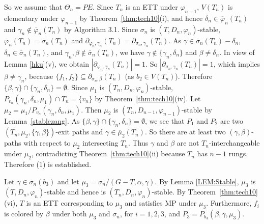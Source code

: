 \documentclass[11pt]{article}
\newcommand{\phibar}{\overline{\varphi}}
\newcommand{\phiv}{\varphi}
\begin{document}
So we assume that $\Theta_n=PE$. Since $T_n$ is an ETT under $\varphi_{n-1}$, $V(T_n)$ is elementary under $\varphi_{n-1}$ by 
Theorem~\ref{thm:tech10}(i), and hence $\delta_n\in\phibar_n(T_n)$ and $\gamma_n\notin\phibar_n(T_n)$ by Algorithm 3.1. Since 
$\sigma_n$ is $(T, D_n, \phiv_{n})$-stable, $\phibar_n(T_n)=\overline{\sigma}_n(T_n)$ and  $\partial_{\varphi_n, \gamma_n}(T_n)=
\partial_{\sigma_n, \gamma_n}(T_n)$. As $\gamma\in\overline{\sigma}_n(T_n)-\delta_n$, $\delta_n\in\overline{\sigma}_n(T_n)$, 
and $\gamma_n, \beta \notin \overline{\sigma}_n(T_n)$,  we have $\gamma\notin \{\gamma_n,\delta_n\}$ and $\beta\neq\delta_n$. 
In view of Lemma \ref{hku}(v), we obtain $|\partial_{\varphi_n, \gamma_n}(T_n)|=1$. So $|\partial_{\sigma_n, \gamma_n}(T_n)|=1$, 
which implies $\beta\neq\gamma_n$, because $\{f_1,f_2\} \subseteq  \partial_{\sigma_n, \beta}(T_n)$ (as $b_2\in V(T_n)$). Therefore 
$\{\beta, \gamma\}\cap \{\gamma_n,\delta_n\}=\emptyset$. 
Since $\mu_1$ is $(T_n,D_n,\varphi_n)$-stable, $P_{v_n}(\gamma_n,\delta_n,\mu_1) \cap T_n=\{v_n\}$ by Theorem~\ref{thm:tech10}(iv). 
Let $\mu_2=\mu_1/P_{v_n}(\gamma_n,\delta_n,\mu_1)$. Then $\mu_2$ is $(T_n,D_{n-1},\varphi_{n-1})$-stable by Lemma~\ref{stablezang}.
As $\{\beta, \gamma\}\cap \{\gamma_n,\delta_n\}=\emptyset$,  we see that $P_1$ and $P_2$ are two $(T_n, \mu_2, \{\gamma, \beta\})$-exit 
paths and $\gamma\in\overline{\mu}_2(T_n)$. So there are at least two $(\gamma, \beta)$-paths with respect to $\mu_2$ intersecting $T_n$. 
Thus $\gamma$ and $\beta$ are not $T_n$-interchangeable under $\mu_2$, contradicting Theorem~\ref{thm:tech10}(ii) because $T_n$ has $n-1$ rungs. 
Therefore (1) is established.

Let $\gamma\in\overline{\sigma}_n(b_3)$ and let $\mu_3=\sigma_n/(G-T,\alpha,\gamma)$. By Lemma \ref{LEM:Stable}, 
$\mu_3$ is $(T,D_n,\varphi_n)$-stable and hence is $(T_n,D_n,\varphi_n)$-stable. By Theorem~\ref{thm:tech10}(vi), $T$
is an ETT corresponding to $\mu_3$ and satisfies MP under $\mu_3$. Furthermore, $f_i$ is colored by $\beta$ under both $\mu_3$ 
and $\sigma_n$, for $i=1,2,3$, and $P_3=P_{b_3}(\beta, \gamma, \mu_3)$.
\end{document}
